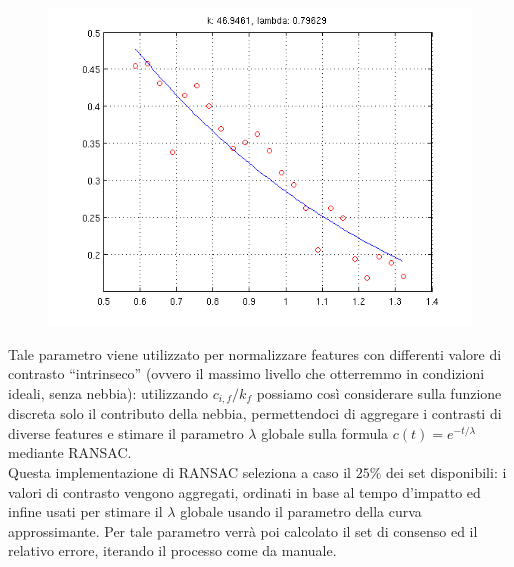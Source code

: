 \documentclass[12pt]{report}
\begin{document}
\begin{figure}[H]
	\centering
	\includegraphics[scale=0.75]{images/fitting.png}
	\label{fig:fitting}
\end{figure}

\noindent Tale parametro viene utilizzato per normalizzare features con differenti valore di contrasto ``intrinseco'' (ovvero il massimo livello che otterremmo in condizioni ideali, senza nebbia): utilizzando $c_{i,f}/k_f$ possiamo cos\`i considerare sulla funzione discreta solo il contributo della nebbia, permettendoci di aggregare i contrasti di diverse features e stimare il parametro $\lambda$ globale sulla formula $ c(t) = e^{-t/\lambda} $ mediante RANSAC.\\

\noindent Questa implementazione di RANSAC seleziona a caso il $25\%$ dei set disponibili: i valori di contrasto vengono aggregati, ordinati in base al tempo d'impatto ed infine usati per stimare il $\lambda$ globale usando il parametro della curva approssimante. Per tale parametro verr\`a poi calcolato il set di consenso ed il relativo errore, iterando il processo come da manuale.\\
\end{document}
